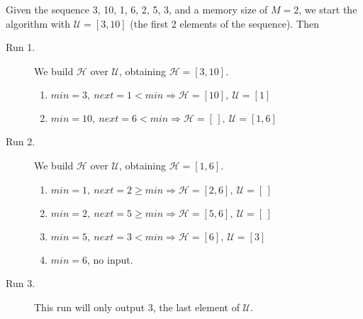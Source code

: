 Given the sequence 3, 10, 1, 6, 2, 5, 3, and a memory size of $M = 2$, we start
the algorithm with $\mathcal{U} = [3, 10]$ (the first 2 elements of the
sequence). Then
%
\begin{description}

  \item[Run 1.] We build $\mathcal{H}$ over $\mathcal{U}$, obtaining
  $\mathcal{H} = [3, 10]$.
  \begin{enumerate}

    \item $min = 3,\ next = 1 < min \Longrightarrow \mathcal{H} = [10],\
    \mathcal{U} = [1]$

    \item $min = 10,\ next = 6 < min \Longrightarrow \mathcal{H} = [\,],\
    \mathcal{U} = [1, 6]$

  \end{enumerate}

  \item[Run 2.] We build $\mathcal{H}$ over $\mathcal{U}$, obtaining
  $\mathcal{H} = [1, 6]$.
  \begin{enumerate}

    \item $min = 1,\ next = 2 \ge min \Longrightarrow \mathcal{H} = [2, 6],\
    \mathcal{U} = [\,]$

    \item $min = 2,\ next = 5 \ge min \Longrightarrow \mathcal{H} = [5, 6],\
    \mathcal{U} = [\,]$

    \item $min = 5,\ next = 3 < min \Longrightarrow \mathcal{H} = [6],\
    \mathcal{U} = [3]$

    \item $min = 6$, no input.

  \end{enumerate}

  \item[Run 3.] This run will only output 3, the last element of $\mathcal{U}$.

\end{description}
